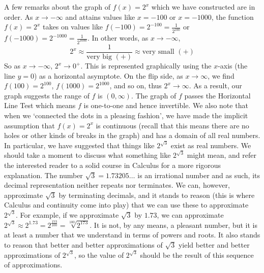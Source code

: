 A few remarks about the graph of $f(x) = 2^{x}$ which we have constructed are in order.  As $x \rightarrow -\infty$ and attains values like $x = -100$ or $x=-1000$, the function $f(x) = 2^{x}$ takes on values like $f(-100) = 2^{-100} = \frac{1}{2^{100}}$ or $f(-1000) = 2^{-1000} = \frac{1}{2^{1000}}$.  In other words, as $x \rightarrow -\infty$, \[2^{x} \approx \frac{1}{\mbox{very big $(+)$}}  \approx \mbox{very small $(+)$}\]  So as $x \rightarrow -\infty$, $2^{x} \rightarrow 0^{+}$.  This is represented graphically using the $x$-axis (the line $y = 0$) as a horizontal asymptote.  On the flip side, as $x \rightarrow \infty$, we find $f(100) = 2^{100}$, $f(1000) = 2^{1000}$, and so on, thus $2^{x} \rightarrow \infty$. As a result, our graph suggests the range of $f$ is $(0,\infty)$.  The graph of $f$ passes the Horizontal Line Test which means $f$ is one-to-one and hence invertible.  We also note that when we `connected the dots in a pleasing fashion', we have made the implicit assumption that $f(x) = 2^{x}$ is continuous (recall that this means there are no holes or other kinds of breaks in the graph) and has a domain of all real numbers.  In particular, we have suggested that things like $2^{\sqrt{3}}$ exist as real numbers.  We should take a moment to discuss what something like $2^{\sqrt{3}}$ might mean, and refer the interested reader to a solid course in Calculus for a more rigorous explanation.  The number $\sqrt{3} = 1.73205 \ldots$ is an irrational number and as such, its decimal representation neither repeats nor terminates.  We can, however, approximate $\sqrt{3}$ by terminating decimals, and it stands to reason (this is where Calculus and continuity come into play) that we can use these to approximate $2^{\sqrt{3}}$.  For example, if we approximate $\sqrt{3}$ by $1.73$, we can approximate $2^{\sqrt{3}} \approx 2^{1.73} = 2^{\frac{173}{100}} = \sqrt[100]{2^{173}}$. It is not, by any means, a pleasant number, but it is at least a number that we understand in terms of powers and roots.  It also stands to reason that better and better approximations of $\sqrt{3}$ yield better and better approximations of $2^{\sqrt{3}}$, so the value of $2^{\sqrt{3}}$ should be the result of this sequence of approximations. 


\pagebreak

